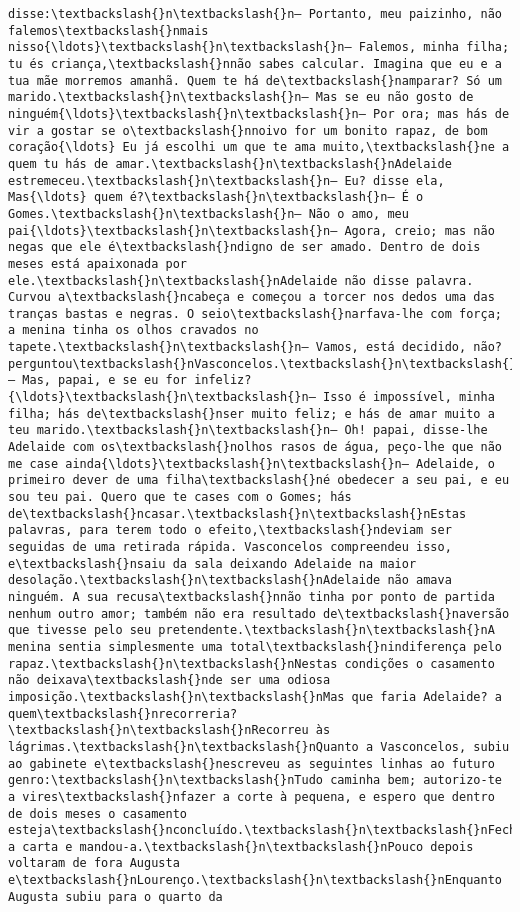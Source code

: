 \documentclass[11pt]{article}
\begin{document}
\begin{Verbatim}[commandchars=\\\{\}]
disse:\textbackslash{}n\textbackslash{}n— Portanto, meu paizinho, não falemos\textbackslash{}nmais nisso{\ldots}\textbackslash{}n\textbackslash{}n— Falemos, minha filha; tu és criança,\textbackslash{}nnão sabes calcular. Imagina que eu e a tua mãe morremos amanhã. Quem te há de\textbackslash{}namparar? Só um marido.\textbackslash{}n\textbackslash{}n— Mas se eu não gosto de ninguém{\ldots}\textbackslash{}n\textbackslash{}n— Por ora; mas hás de vir a gostar se o\textbackslash{}nnoivo for um bonito rapaz, de bom coração{\ldots} Eu já escolhi um que te ama muito,\textbackslash{}ne a quem tu hás de amar.\textbackslash{}n\textbackslash{}nAdelaide estremeceu.\textbackslash{}n\textbackslash{}n— Eu? disse ela, Mas{\ldots} quem é?\textbackslash{}n\textbackslash{}n— É o Gomes.\textbackslash{}n\textbackslash{}n— Não o amo, meu pai{\ldots}\textbackslash{}n\textbackslash{}n— Agora, creio; mas não negas que ele é\textbackslash{}ndigno de ser amado. Dentro de dois meses está apaixonada por ele.\textbackslash{}n\textbackslash{}nAdelaide não disse palavra. Curvou a\textbackslash{}ncabeça e começou a torcer nos dedos uma das tranças bastas e negras. O seio\textbackslash{}narfava-lhe com força; a menina tinha os olhos cravados no tapete.\textbackslash{}n\textbackslash{}n— Vamos, está decidido, não? perguntou\textbackslash{}nVasconcelos.\textbackslash{}n\textbackslash{}n— Mas, papai, e se eu for infeliz?{\ldots}\textbackslash{}n\textbackslash{}n— Isso é impossível, minha filha; hás de\textbackslash{}nser muito feliz; e hás de amar muito a teu marido.\textbackslash{}n\textbackslash{}n— Oh! papai, disse-lhe Adelaide com os\textbackslash{}nolhos rasos de água, peço-lhe que não me case ainda{\ldots}\textbackslash{}n\textbackslash{}n— Adelaide, o primeiro dever de uma filha\textbackslash{}né obedecer a seu pai, e eu sou teu pai. Quero que te cases com o Gomes; hás de\textbackslash{}ncasar.\textbackslash{}n\textbackslash{}nEstas palavras, para terem todo o efeito,\textbackslash{}ndeviam ser seguidas de uma retirada rápida. Vasconcelos compreendeu isso, e\textbackslash{}nsaiu da sala deixando Adelaide na maior desolação.\textbackslash{}n\textbackslash{}nAdelaide não amava ninguém. A sua recusa\textbackslash{}nnão tinha por ponto de partida nenhum outro amor; também não era resultado de\textbackslash{}naversão que tivesse pelo seu pretendente.\textbackslash{}n\textbackslash{}nA menina sentia simplesmente uma total\textbackslash{}nindiferença pelo rapaz.\textbackslash{}n\textbackslash{}nNestas condições o casamento não deixava\textbackslash{}nde ser uma odiosa imposição.\textbackslash{}n\textbackslash{}nMas que faria Adelaide? a quem\textbackslash{}nrecorreria?\textbackslash{}n\textbackslash{}nRecorreu às lágrimas.\textbackslash{}n\textbackslash{}nQuanto a Vasconcelos, subiu ao gabinete e\textbackslash{}nescreveu as seguintes linhas ao futuro genro:\textbackslash{}n\textbackslash{}nTudo caminha bem; autorizo-te a vires\textbackslash{}nfazer a corte à pequena, e espero que dentro de dois meses o casamento esteja\textbackslash{}nconcluído.\textbackslash{}n\textbackslash{}nFechou a carta e mandou-a.\textbackslash{}n\textbackslash{}nPouco depois voltaram de fora Augusta e\textbackslash{}nLourenço.\textbackslash{}n\textbackslash{}nEnquanto Augusta subiu para o quarto da 
\end{Verbatim}
\end{document}
